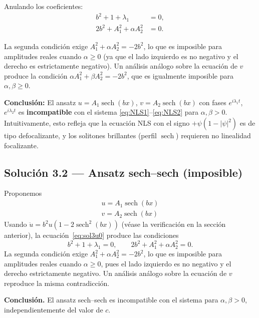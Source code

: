 \documentclass[letterpaper,11pt]{exam}
\newcommand{\sech}{\operatorname{sech}}
\theoremstyle{plain}
\begin{document}
Anulando los coeficientes:
\begin{align*}
    b^2+1+\lambda_1&=0, \\
    2b^2+A_1^2+\alpha A_2^2&=0.
\end{align*}

La segunda condición exige $A_1^2+\alpha A_2^2=-2b^2$, lo que es imposible para amplitudes reales cuando $\alpha\geq 0$ (ya que el lado izquierdo es no negativo y el derecho es estrictamente negativo).
Un análisis análogo sobre la ecuación de $v$ produce la condición $\alpha A_1^2+\beta A_2^2=-2b^2$, que es igualmente imposible para $\alpha,\beta\geq 0$.

\medskip
\textbf{Conclusión:} El ansatz $u=A_1\sech(bx)$, $v=A_2\sech(bx)$ con fases $e^{i\lambda_1 t}$, $e^{i\lambda_2 t}$
es \textbf{incompatible} con el sistema \eqref{eq:NLS1}--\eqref{eq:NLS2} para $\alpha,\beta>0$.
Intuitivamente, esto refleja que la ecuación NLS con el signo $+\psi(1-|\psi|^2)$ es de tipo defocalizante,
y los solitones brillantes (perfil $\sech$) requieren no linealidad focalizante.

\subsection{Solución 3.2 — Ansatz sech--sech (imposible)}
\label{sec:sol32}

Proponemos 
\begin{align*}
    u = A_1\operatorname{sech}(bx) \\
    v = A_2\operatorname{sech}(bx)
\end{align*}
Usando
$\ddot{u} = b^2 u(1-2\operatorname{sech}^2(bx))$ (véase la verificación en la sección anterior),
la ecuación~\eqref{eq:sol3u0} produce las condiciones
\begin{equation*}
    b^2 + 1 + \lambda_1 = 0, \qquad
    2b^2 + A_1^2 + \alpha A_2^2 = 0.
\end{equation*}
La segunda condición exige $A_1^2 + \alpha A_2^2 = -2b^2$, lo que es imposible para amplitudes
reales cuando $\alpha\geq 0$, pues el lado izquierdo es no negativo y el derecho estrictamente
negativo. Un análisis análogo sobre la ecuación de $v$ reproduce la misma contradicción.

\medskip
\noindent\textbf{Conclusión.} El ansatz sech--sech es incompatible con el sistema para
$\alpha,\beta>0$, independientemente del valor de $c$.

\end{document}
